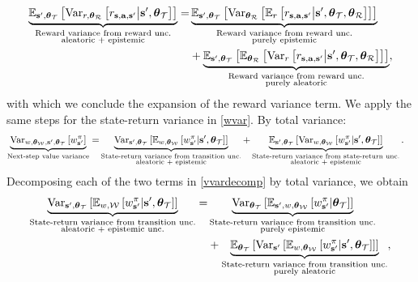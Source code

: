 \documentclass{article}
\begin{document}
\begin{align}\label{appeq:rerwvarrew}
\underbrace{\E_{\ns, \thetamct}\sqb{ \Var_{r, \thetamcr} \sqb{\rsanb \big| \ns, \thetamct}}}_{\substack{\text{Reward variance from reward unc.} \\ \text{aleatoric + epistemic}}} = &\underbrace{\E_{\ns, \thetamct}\sqb{ \Var_{\thetamcr} \sqb{ \E_r \sqb{\rsanb \big| \ns, \thetamct, \thetamcr}}}}_{\substack{\text{Reward variance from reward unc.} \\ \text{purely epistemic}}} \\ 
&+ \underbrace{\E_{\ns, \thetamct}\sqb{ \E_{\thetamcr} \sqb{ \Var_r \sqb{\rsanb \big| \ns, \thetamct, \thetamcr}}}}_{\substack{\text{Reward variance from reward unc.} \\ \text{purely aleatoric}}},\nonumber
\end{align}
with which we conclude the expansion of the reward variance term. We apply the same steps for the state-return variance in \cref{wvar}. By total variance:
\begin{align} \label{vvardecomp}
\underbrace{\Var_{w, \thetamcw, \ns, \thetamct}\sqb{\wnb}}_{\text{Next-step value variance}} =& \underbrace{\Var_{\ns, \thetamct}\sqb{\E_{w, \thetamcw} \sqb{\wnb | \ns, \thetamct}}}_{\substack{\text{State-return variance from transition unc.} \\ \text{aleatoric + epistemic}}} + \underbrace{\E_{\ns, \thetamct}\sqb{\Var_{w, \thetamcw} \sqb{\wnb | \ns, \thetamct}}}_{\substack{\text{State-return variance from state-return unc.} \\ \text{aleatoric + epistemic}}}.
\end{align}
Decomposing each of the two terms in \cref{vvardecomp} by total variance, we obtain
\begin{align*}
\underbrace{\Var_{\ns, \thetamct}\sqb{\E_{w, \mcw} \sqb{\wnb | \ns, \thetamct}}}_{\substack{\text{State-return variance from transition unc.} \\ \text{aleatoric + epistemic unc.}}} =& \underbrace{\Var_{\thetamct} \sqb{\E_{\ns, w, \thetamcw} \sqb{\wnb | \thetamct}}}_{\substack{\text{State-return variance from transition unc.} \\ \text{purely epistemic}}} \\
& + \underbrace{\E_{\thetamct}\sqb{ \Var_{\ns} \sqb{\E_{w, \thetamcw} \sqb{\wnb | \ns, \thetamct}}}}_{\substack{\text{State-return variance from transition unc.} \\ \text{purely aleatoric}}},
\end{align*}
\end{document}
